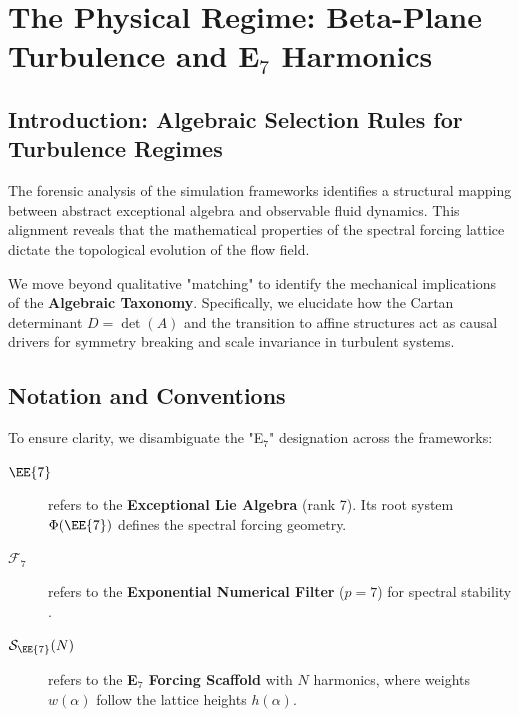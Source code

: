 
\chapter{The Physical Regime: Beta-Plane Turbulence and E$_7$ Harmonics}
\label{ch:physical_regime}

\section{Introduction: Algebraic Selection Rules for Turbulence Regimes}

The forensic analysis of the simulation frameworks identifies a structural mapping between abstract exceptional algebra and observable fluid dynamics. This alignment reveals that the mathematical properties of the spectral forcing lattice dictate the topological evolution of the flow field. 

We move beyond qualitative "matching" to identify the mechanical implications of the \textbf{Algebraic Taxonomy}. Specifically, we elucidate how the Cartan determinant $D = \det(A)$ and the transition to affine structures act as causal drivers for symmetry breaking and scale invariance in turbulent systems.

\section{Notation and Conventions}

To ensure clarity, we disambiguate the "E$_7$" designation across the frameworks:

\begin{description}
    \item[$\EE{7}$] refers to the \textbf{Exceptional Lie Algebra} (rank 7). Its root system $\Phi(\EE{7})$ defines the spectral forcing geometry.
    \item[$\mathcal{F}_7$] refers to the \textbf{Exponential Numerical Filter} ($p=7$) for spectral stability \cite{hou2007computing}.
    \item[$\mathcal{S}_{\EE{7}}(N)$] refers to the \textbf{E$_7$ Forcing Scaffold} with $N$ harmonics, where weights $w(\alpha)$ follow the lattice heights $h(\alpha)$.
\end{description}

